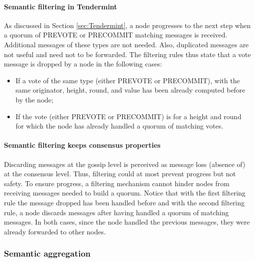 \paragraph{Semantic filtering in Tendermint} 
As discussed  in Section \ref{sec:Tendermint}, a node progresses   to the next step when a quorum of \textsc{PREVOTE} or \textsc{PRECOMMIT} matching messages is received.  Additional messages of these types are not needed.  Also, duplicated messages are not useful and need not to be forwarded.   The filtering rules thus state that a vote message is dropped by a node in the following cases:  
\begin{itemize}
\item If a vote of the same type (either \textsc{PREVOTE} or \textsc{PRECOMMIT}), with the same originator,  height, round, and value has been already computed before by the node;
\item If the vote (either \textsc{PREVOTE} or \textsc{PRECOMMIT}) is for a height and round for which the node has already handled a quorum of matching votes.
\end{itemize}

\paragraph{Semantic filtering keeps consensus properties}

Discarding messages at the gossip level is perceived as message loss (absence of) at the consensus level.  Thus, filtering could at most prevent progress but not safety.
To ensure progress, a filtering mechanism cannot hinder nodes from receiving messages needed to build a quorum. 
%
Notice that with the first filtering rule the message dropped has been handled before and
with the second filtering rule, a node discards messages after having handled a quorum of matching messages.   In both cases, since the node handled the previous messages, they were already forwarded to other nodes.  




\subsubsection{Semantic aggregation}

